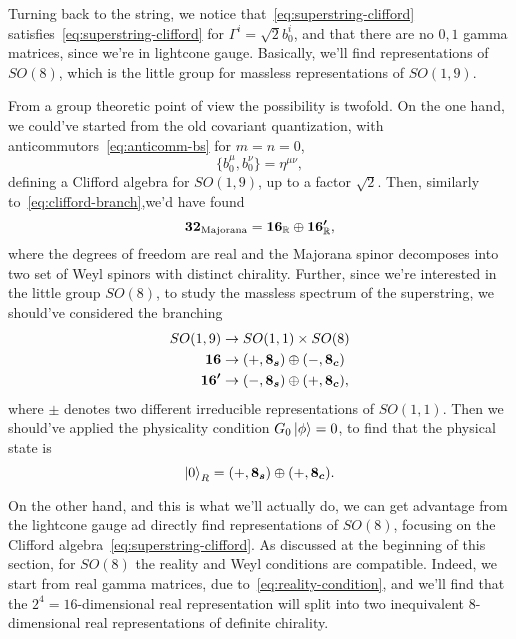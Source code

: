 Turning back to the string, we notice that~\eqref{eq:superstring-clifford} satisfies~\eqref{eq:superstring-clifford} for $\Gamma^i = \sqrt{2} b^i_0$, and that there are no $0,1$ gamma matrices, since we're in lightcone gauge. Basically, we'll find representations of $SO(8)$, which is the little group for massless representations of $SO(1,9)$.

From a group theoretic point of view the possibility is twofold. On the one hand, we could've started from the old covariant quantization, with anticommutors~\eqref{eq:anticomm-bs} for $m=n=0$,
\begin{equation}
    \{ b^\mu_0, b^\nu_0 \} = \eta^{\mu\nu},
\end{equation}
defining a Clifford algebra for $SO(1,9)$, up to a factor $\sqrt{2}$. Then, similarly to~\eqref{eq:clifford-branch},we'd have found
\begin{equation}
    \boldsymbol{32}_\textup{Majorana} = \boldsymbol{16}_\mathbb{R} \oplus \boldsymbol{16'}_\mathbb{R} ,
\end{equation}
where the degrees of freedom are real and the Majorana spinor decomposes into two set of Weyl spinors with distinct chirality. Further, since we're interested in the little group $SO(8)$, to study the massless spectrum of the superstring, we should've considered the branching
\begin{equation}
\begin{aligned}
    SO(1,9) &\to SO(1,1) \times SO(8) \\
    \boldsymbol{16} &\to (+,\boldsymbol{8_s}) \oplus (-,\boldsymbol{8_c}) \\
    \boldsymbol{16'} &\to (-,\boldsymbol{8_s}) \oplus (+,\boldsymbol{8_c}) ,
\end{aligned}
\end{equation}
where $\pm$ denotes two different irreducible representations of $SO(1,1)$. Then we should've applied the physicality condition $G_0\ket{\phi}=0$, to find that the physical state is
\begin{equation}
    \ket{0}_{R} = (+,\boldsymbol{8_s}) \oplus (+,\boldsymbol{8_c}) .
\end{equation}

On the other hand, and this is what we'll actually do, we can get advantage from the lightcone gauge ad directly find representations of $SO(8)$, focusing on the Clifford algebra~\eqref{eq:superstring-clifford}. As discussed at the beginning of this section, for $SO(8)$ the reality and Weyl conditions are compatible. Indeed, we start from real gamma matrices, due to~\eqref{eq:reality-condition}, and we'll find that the $2^4=16$-dimensional real representation will split into two inequivalent $8$-dimensional real representations of definite chirality.

